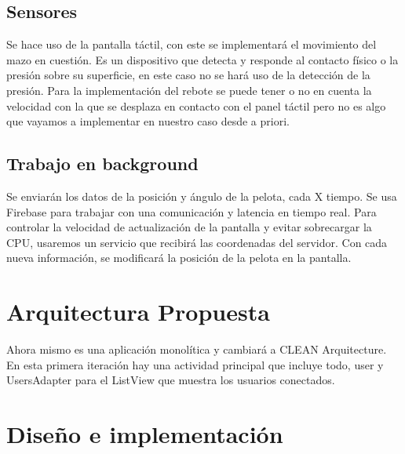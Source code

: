 \documentclass[a4paper,openright,12pt]{article}
\begin{document}
\subsection{Sensores}
Se hace uso de la pantalla táctil, con este se implementará el movimiento del mazo en cuestión. Es un dispositivo que detecta y responde al contacto físico o la presión sobre su superficie, en este caso no se hará uso de la detección de la presión. Para la implementación del rebote se puede tener o no en cuenta la velocidad con la que se desplaza en contacto con el panel táctil pero no es algo que vayamos a implementar en nuestro caso desde a priori.
\subsection{Trabajo en background}
Se enviarán los datos de la posición y ángulo de la pelota, cada X tiempo. Se usa Firebase para trabajar con una comunicación y latencia en tiempo real. Para controlar la velocidad de actualización de la pantalla y evitar sobrecargar la CPU, usaremos un servicio que recibirá las coordenadas del servidor. Con cada nueva información, se modificará la posición de la pelota en la pantalla.

\section{Arquitectura Propuesta}
Ahora mismo es una aplicación monolítica y cambiará a CLEAN Arquitecture. En esta primera iteración hay una actividad principal que incluye todo, user y UsersAdapter para el ListView que muestra los usuarios conectados. 

\section{Diseño e implementación}
\end{document}
